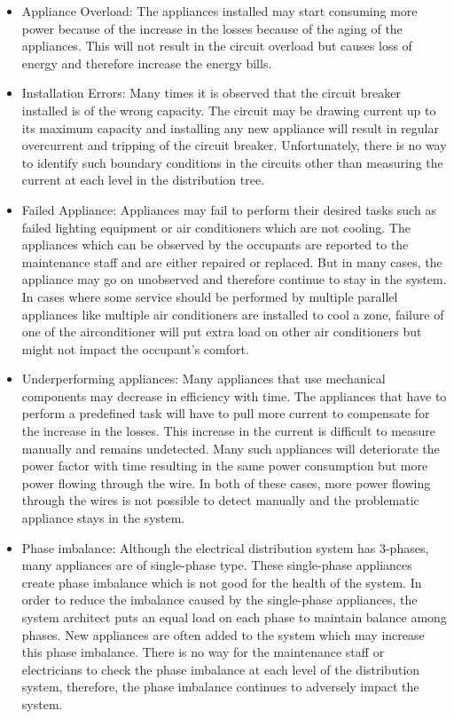 \begin{itemize}
\item Appliance Overload: The appliances installed may start consuming more power because of the increase in the losses because of the aging of the appliances. This will not result in the circuit overload but causes loss of energy and therefore increase the energy bills.

\item Installation Errors: Many times it is observed that the circuit breaker installed is of the wrong capacity. The circuit may be drawing current up to its maximum capacity and installing any new appliance will result in regular overcurrent and tripping of the circuit breaker. Unfortunately, there is no way to identify such boundary conditions in the circuits other than measuring the current at each level in the distribution tree.

\item Failed Appliance: Appliances may fail to perform their desired tasks such as failed lighting equipment or air conditioners which are not cooling. The appliances which can be observed by the occupants are reported to the maintenance staff and are either repaired or replaced. But in many cases, the appliance may go on unobserved and therefore continue to stay in the system. In cases where some service should be performed by multiple parallel appliances like multiple air conditioners are installed to cool a zone, failure of one of the airconditioner will put extra load on other air conditioners but might not impact the occupant's comfort.

\item Underperforming appliances: Many appliances that use mechanical components may decrease in efficiency with time. The appliances that have to perform a predefined task will have to pull more current to compensate for the increase in the losses. This increase in the current is difficult to measure manually and remains undetected. Many such appliances will deteriorate the power factor with time resulting in the same power consumption but more power flowing through the wire. In both of these cases, more power flowing through the wires is not possible to detect manually and the problematic appliance stays in the system.

\item Phase imbalance: Although the electrical distribution system has 3-phases, many appliances are of single-phase type. These single-phase appliances create phase imbalance which is not good for the health of the system. In order to reduce the imbalance caused by the single-phase appliances, the system architect puts an equal load on each phase to maintain balance among phases. New appliances are often added to the system which may increase this phase imbalance. There is no way for the maintenance staff or electricians to check the phase imbalance at each level of the distribution system, therefore, the phase imbalance continues to adversely impact the system.


\end{itemize}
